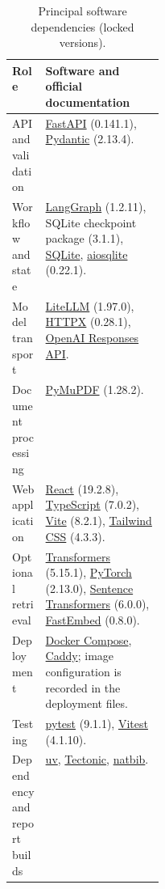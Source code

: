 \begin{table}[htbp]
\centering\small
\caption{Principal software dependencies (locked versions).}
\label{tab:software}
\begin{tabularx}{\linewidth}{@{}>{\raggedright\arraybackslash}L{0.22\linewidth}>{\raggedright\arraybackslash}Y@{}}
\toprule
Role & Software and official documentation \\
\midrule
API and validation & \href{https://fastapi.tiangolo.com/}{FastAPI} (0.141.1), \href{https://pydantic.dev/docs/validation/latest/get-started/}{Pydantic} (2.13.4). \\
Workflow and state & \href{https://docs.langchain.com/oss/python/langgraph/overview}{LangGraph} (1.2.11), SQLite checkpoint package (3.1.1), \href{https://www.sqlite.org/docs.html}{SQLite}, \href{https://aiosqlite.omnilib.dev/en/stable/}{aiosqlite} (0.22.1). \\
Model transport & \href{https://docs.litellm.ai/docs/}{LiteLLM} (1.97.0), \href{https://www.python-httpx.org/}{HTTPX} (0.28.1), \href{https://developers.openai.com/api/docs/guides/text}{OpenAI Responses API}. \\
Document processing & \href{https://pymupdf.readthedocs.io/en/latest/}{PyMuPDF} (1.28.2). \\
Web application & \href{https://react.dev/}{React} (19.2.8), \href{https://www.typescriptlang.org/docs/}{TypeScript} (7.0.2), \href{https://vite.dev/guide/}{Vite} (8.2.1), \href{https://tailwindcss.com/docs/installation/using-vite}{Tailwind CSS} (4.3.3). \\
Optional retrieval & \href{https://huggingface.co/docs/transformers/index}{Transformers} (5.15.1), \href{https://docs.pytorch.org/docs/stable/index.html}{PyTorch} (2.13.0), \href{https://www.sbert.net/}{Sentence Transformers} (6.0.0), \href{https://qdrant.github.io/fastembed/}{FastEmbed} (0.8.0). \\
Deployment & \href{https://docs.docker.com/compose/}{Docker Compose}, \href{https://caddyserver.com/docs/}{Caddy}; image configuration is recorded in the deployment files. \\
Testing & \href{https://docs.pytest.org/en/stable/}{pytest} (9.1.1), \href{https://vitest.dev/guide/}{Vitest} (4.1.10). \\
Dependency and report builds & \href{https://docs.astral.sh/uv/}{uv}, \href{https://tectonic-typesetting.github.io/en-US/}{Tectonic}, \href{https://ctan.org/pkg/natbib}{natbib}. \\
\bottomrule
\end{tabularx}
\end{table}

